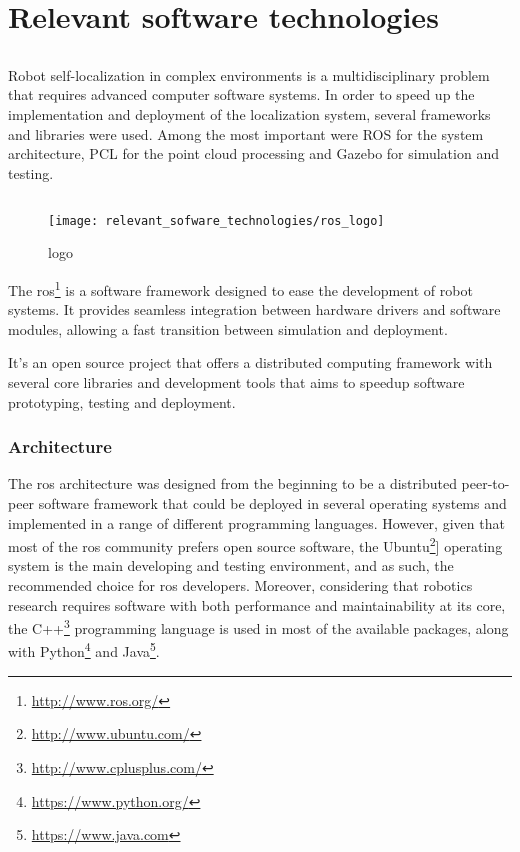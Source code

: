 \chapter{Relevant software technologies} \label{chap:relevant-sofware-technologies}



\section*{}

Robot self-localization in complex environments is a multidisciplinary problem that requires advanced computer software systems. In order to speed up the implementation and deployment of the localization system, several frameworks and libraries were used. Among the most important were ROS for the system architecture, PCL for the point cloud processing and Gazebo for simulation and testing.



\section{}

\begin{wrapfigure}{r}{0.25\textwidth}
	\centering
	\texttt{[image: relevant\_sofware\_technologies/ros\_logo]}
	\caption{ logo}
	\label{fig:relevant-sofware-technologies_ros-logo}
\end{wrapfigure}

The \gls{ros}\footnote{\url{http://www.ros.org/}} \cite{Quigley2009} is a software framework designed to ease the development of robot systems. It provides seamless integration between hardware drivers and software modules, allowing a fast transition between simulation and deployment.

It's an open source project that offers a distributed computing framework with several core libraries and development tools that aims to speedup software prototyping, testing and deployment.


\subsection{Architecture}

The \gls{ros} architecture was designed from the beginning to be a distributed peer-to-peer software framework that could be deployed in several operating systems and implemented in a range of different programming languages. However, given that most of the \gls{ros} community prefers open source software, the Ubuntu\footnote{\url{http://www.ubuntu.com/}}] operating system is the main developing and testing environment, and as such, the recommended choice for \gls{ros} developers. Moreover, considering that robotics research requires software with both performance and maintainability at its core, the C++\footnote{\url{http://www.cplusplus.com/}} programming language is used in most of the available packages, along with Python\footnote{\url{https://www.python.org/}} and Java\footnote{\url{https://www.java.com}}.

